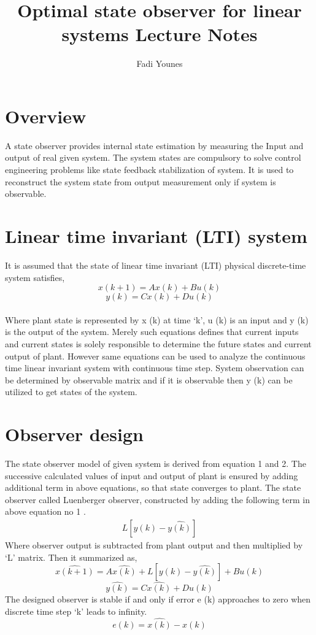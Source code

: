 \documentclass[12pt,a4paper]{article}
\begin{document}
\title{Optimal state observer for linear systems Lecture Notes} 
\author {Fadi Younes}
\maketitle
\newpage
\section*{Overview}
A state observer provides internal state estimation by measuring the Input and output of real given system. The system states are compulsory to solve control engineering problems like state feedback stabilization of system. It is used to reconstruct the system state from output measurement only if system is observable. 
\section*{Linear time invariant (LTI) system}
It is assumed that the state of linear time invariant (LTI) physical discrete-time system satisfies, \cite{khalil2002nonlinear}\\
\begin{equation}
x(k+1) = Ax(k) + Bu(k)
\end{equation}
\begin{equation}
y(k) = Cx(k) + Du(k)
\end{equation}\\
Where plant state is represented by x (k) at time ‘k’, u (k) is an input and y (k) is the output of the system. Merely such equations defines that current inputs and current states is solely responsible to determine the future states and current output of plant. However same equations can be used to analyze the continuous time linear invariant system with continuous time step. System observation can be determined by observable matrix and if it is observable then y (k) can be utilized to get states of the system.
\section*{Observer design}
The state observer model of given system is derived from equation 1 and 2. The successive calculated values of input and output of plant is ensured by adding additional term in above equations, so that state converges to plant. The state observer called Luenberger observer, constructed by adding the following term in above equation no 1 \cite{bernat2015multi}.\\
\begin{align*}
L[y(k)-\hat{y(k)}]
\end{align*}
Where observer output is subtracted from plant output and then multiplied by ‘L’ matrix. Then it summarized as,
\begin{equation}
\hat{x(k+1)} = A\hat{x(k)} + L[y(k)-\hat{y(k)}]+ Bu(k)
\end{equation}
\begin{equation}
\hat{y(k)} = C\hat{x(k)} + Du(k)
\end{equation}
The designed observer is stable if and only if error e (k) approaches to zero when discrete time step ‘k’ leads to infinity.
\begin{equation}
e(k)= \hat{x(k)}-x(k)
\end{equation}
\end{document}
